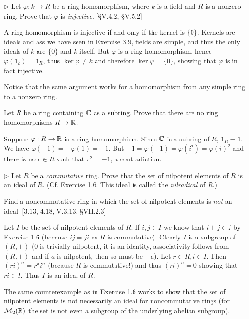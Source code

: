 \begin{problem}
	$\triangleright$ Let $\varphi: k \to R$ be a ring homomorphism, where $k$ is a field and $R$ is a nonzero ring. Prove that $\varphi$ is \emph{injective}. [\S V.4.2, \S V.5.2]
\end{problem}

\begin{solution}
	A ring homomorphism is injective if and only if the kernel is $\{0\}$. Kernels are ideals and ass we have seen in Exercise 3.9, fields are simple, and thus the only ideals of $k$ are $\{0\}$ and $k$ itself. But $\varphi$ is a ring homomorphism, hence $\varphi(1_k) = 1_R$, thus $\ker \varphi \neq k$ and therefore $\ker \varphi = \{0\}$, showing that $\varphi$ is in fact injective.
	
	Notice that the same argument works for a homomorphism from any simple ring to a nonzero ring.
\end{solution}

\begin{problem}
	Let $R$ be a ring containing $\mathbb{C}$ as a subring. Prove that there are no ring homomorphisms $R \to \mathbb{R}$.
\end{problem}

\begin{solution}
	Suppose $\varphi: R \to \mathbb{R}$ is a ring homomorphism. Since $\mathbb{C}$ is a subring of $R$, $1_R = 1$. We have $\varphi(-1) = -\varphi(1) = -1$. But $-1 = \varphi(-1) = \varphi(i^2) = \varphi(i)^2$ and there is no $r \in R$ such that $r^2 = -1$, a contradiction.
\end{solution}

\begin{problem}
	$\triangleright$ Let $R$ be a \emph{commutative} ring. Prove that the set of nilpotent elements of $R$ is an ideal of $R$. (Cf. Exercise 1.6. This ideal is called the \emph{nilradical} of $R$.)
	
	Find a noncommutative ring in which the set of nilpotent elements is \emph{not} an ideal. [3.13, 4.18, V.3.13, \S VII.2.3]
\end{problem}

\begin{solution}
	Let $I$ be the set of nilpotent elements of $R$. If $i, j \in I$ we know that $i + j \in I$ by Exercise 1.6 (because $ij = ji$ as $R$ is commutative). Clearly $I$ is a subgroup of $(R, +)$ ($0$ is trivially nilpotent, it is an identity, associativity follows from $(R, +)$ and if $a$ is nilpotent, then so must be $-a$). Let $r \in R, i \in I$. Then $(ri)^n = r^n i^n$ (because $R$ is commutative!) and thus $(ri)^n = 0$ showing that $ri \in I$. Thus $I$ is an ideal of $R$.
	
	The same counterexample as in Exercise 1.6 works to show that the set of nilpotent elements is not necessarily an ideal for noncommutative rings (for $\mathcal{M}_2(\mathbb{R})$ the set is not even a subgroup of the underlying abelian subgroup).
\end{solution}

